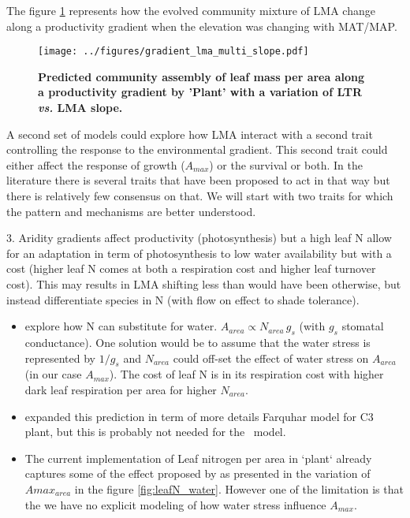 \documentclass[a4paper,11pt]{article}
\begin{document}
The figure \ref{fig:lma_mat_o_map} represents how the evolved community mixture of LMA change along a productivity gradient when the elevation was changing with MAT/MAP.

\begin{figure}[ht]
\centering
\texttt{[image: ../figures/gradient\_lma\_multi\_slope.pdf]}
\caption{\textbf{Predicted community assembly of leaf mass per area along a productivity gradient by 'Plant' with a variation of LTR \textit{vs.} LMA slope.}
\label{fig:lma_mat_o_map}}
\end{figure}


\clearpage

A second set of models could explore how LMA interact with a second trait controlling the response to the environmental gradient. This second trait could either affect the response of growth ($A_{max}$) or the survival or both. In the literature there is several traits that have been proposed to act in that way but there is relatively few consensus on that. We will start with two traits for which the pattern and mechanisms are better understood.

3. Aridity gradients affect productivity (photosynthesis) but a
high leaf N allow for an adaptation in term of photosynthesis to low water availability but with a cost (higher leaf N comes at both a respiration cost and higher leaf turnover cost). This may results in LMA shifting less than would have been otherwise, but  instead differentiate species in N (with flow on effect to shade tolerance).


\begin{itemize}
\item \citet{Wright-2003} explore how N can substitute for water. $A_{area} \propto N_{area} \, g_s$ (with $g_s$ stomatal conductance). One solution would be to assume that the water stress is represented by $1/g_s$ and $N_{area}$ could off-set the effect of water stress on $A_{area}$ (in our case $A_{max}$). The cost of leaf N is in its respiration cost with higher dark leaf respiration per area for higher $N_{area}$.

\item \citet{Prentice-2014} expanded this prediction in term of more details Farquhar model for C3 plant, but this is probably not needed for the \plant\ model.

\item The current implementation of Leaf nitrogen per area in `plant` already captures some of the effect proposed by \citet{Wright-2003} as presented in the variation of $A{max}_{area}$ in the figure \ref{fig:leafN_water}. However one of the limitation is that the we have no explicit modeling of how water stress influence $A_{max}$.
\end{itemize}
\end{document}
